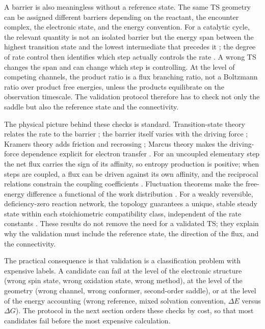 \documentclass[11pt,a4paper]{article}
\begin{document}
A barrier is also meaningless without a reference state. The same TS geometry can be assigned different barriers depending on the reactant, the encounter complex, the electronic state, and the energy convention. For a catalytic cycle, the relevant quantity is not an isolated barrier but the energy span between the highest transition state and the lowest intermediate that precedes it \citep{Kozuch2011Span}; the degree of rate control then identifies which step actually controls the rate \citep{Campbell2017DRC}. A wrong TS changes the span and can change which step is controlling. At the level of competing channels, the product ratio is a flux branching ratio, not a Boltzmann ratio over product free energies, unless the products equilibrate on the observation timescale. The validation protocol therefore has to check not only the saddle but also the reference state and the connectivity.

The physical picture behind these checks is standard. Transition-state theory relates the rate to the barrier \citep{Eyring1935}; the barrier itself varies with the driving force \citep{EvansPolanyi1938}; Kramers theory adds friction and recrossing \citep{Kramers1940}; Marcus theory makes the driving-force dependence explicit for electron transfer \citep{Marcus1956,Marcus1993}. For an uncoupled elementary step the net flux carries the sign of its affinity, so entropy production is positive; when steps are coupled, a flux can be driven against its own affinity, and the reciprocal relations constrain the coupling coefficients \citep{Onsager1931}. Fluctuation theorems make the free-energy difference a functional of the work distribution \citep{Jarzynski1997,Crooks1999,Seifert2012}. For a weakly reversible, deficiency-zero reaction network, the topology guarantees a unique, stable steady state within each stoichiometric compatibility class, independent of the rate constants \citep{Feinberg1987}. These results do not remove the need for a validated TS; they explain why the validation must include the reference state, the direction of the flux, and the connectivity.

The practical consequence is that validation is a classification problem with expensive labels. A candidate can fail at the level of the electronic structure (wrong spin state, wrong oxidation state, wrong method), at the level of the geometry (wrong channel, wrong conformer, second-order saddle), or at the level of the energy accounting (wrong reference, mixed solvation convention, $\Delta E$ versus $\Delta G$). The protocol in the next section orders these checks by cost, so that most candidates fail before the most expensive calculation.
\end{document}
